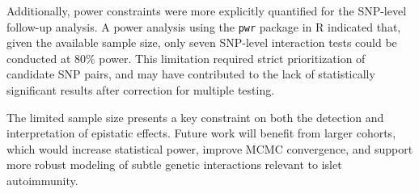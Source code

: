 \documentclass{article}\usepackage[]{graphicx}\usepackage[]{color}
\begin{document}
\par
Additionally, power constraints were more explicitly quantified for the SNP-level follow-up analysis. A power analysis using the \texttt{pwr}\cite{champelyPwrBasicFunctions2020} package in R indicated that, given the available sample size, only seven SNP-level interaction tests could be conducted at 80\% power. This limitation required strict prioritization of candidate SNP pairs, and may have contributed to the lack of statistically significant results after correction for multiple testing.

\par
The limited sample size presents a key constraint on both the detection and interpretation of epistatic effects. Future work will benefit from larger cohorts, which would increase statistical power, improve MCMC convergence, and support more robust modeling of subtle genetic interactions relevant to islet autoimmunity.
\end{document}

